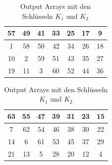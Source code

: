 \begin{table}[h]
    \centering
    \begin{minipage}[t]{0.45\textwidth}
        \begin{tabular}{|*{7}{c|}}
            \hline
            \cellcolor{magenta-1}57 & \cellcolor{cyan-1}49 & \cellcolor{purple-1}41 & \cellcolor{orange-1}33 & 
            \cellcolor{blue-1}25 & \cellcolor{green-1}17 & \cellcolor{yellow-1}9 \\

            \hline
            \cellcolor{red-1}1 & \cellcolor{magenta-1}58 & \cellcolor{cyan-1}50 & \cellcolor{purple-1}42 & 
            \cellcolor{orange-1}34 & \cellcolor{blue-1}26 & \cellcolor{green-1}18 \\

            \hline
            \cellcolor{yellow-1}10 & \cellcolor{red-1}2 & \cellcolor{magenta-1}59 & \cellcolor{cyan-1}51 & 
            \cellcolor{purple-1}43 & \cellcolor{orange-1}35 & \cellcolor{blue-1}27 \\

            \hline
            \cellcolor{green-1}19 & \cellcolor{yellow-1}11 & \cellcolor{red-1}3 & \cellcolor{magenta-1}60 & 
            \cellcolor{cyan-1}52 & \cellcolor{purple-1}44 & \cellcolor{orange-1}36  \\
            \hline
        \end{tabular}
    \end{minipage}
    \hfill
    \begin{minipage}[t]{0.45\textwidth}
        \begin{tabular}{|*{7}{c|}}
            \hline
            \cellcolor{magenta-1}63 & \cellcolor{cyan-1}55 & \cellcolor{purple-1}47 & \cellcolor{orange-1}39 & 
            \cellcolor{blue-1}31 & \cellcolor{green-1}23 & \cellcolor{yellow-1}15 \\

            \hline
            \cellcolor{red-1}7 & \cellcolor{magenta-1}62 & \cellcolor{cyan-1}54 & \cellcolor{purple-1}46 & 
            \cellcolor{orange-1}38 & \cellcolor{blue-1}30 & \cellcolor{green-1}22 \\

            \hline
            \cellcolor{yellow-1}14 & \cellcolor{red-1}6 & \cellcolor{magenta-1}61 & \cellcolor{cyan-1}53 & 
            \cellcolor{purple-1}45 & \cellcolor{orange-1}37 & \cellcolor{blue-1}29 \\

            \hline
            \cellcolor{green-1}21 & \cellcolor{yellow-1}13 & \cellcolor{red-1}5 & \cellcolor{blue-1}28 & 
            \cellcolor{green-1}20 & \cellcolor{yellow-1}12 & \cellcolor{red-1}4  \\
            \hline
        \end{tabular}
    \end{minipage}
    \caption{Output Arrays mit den Schlüsseln $K_1$ und $K_2$}
\end{table}


